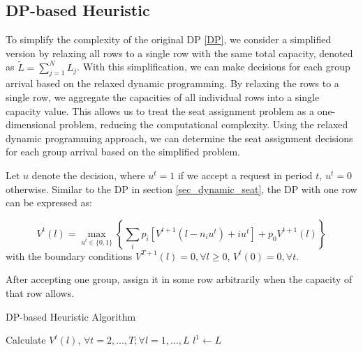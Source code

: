 

\subsection{DP-based Heuristic}
To simplify the complexity of the original DP \ref{DP}, we consider a simplified version by relaxing all rows to a single row with the same total capacity, denoted as $\tilde{L} = \sum_{j=1}^{N} L_j$. With this simplification, we can make decisions for each group arrival based on the relaxed dynamic programming. By relaxing the rows to a single row, we aggregate the capacities of all individual rows into a single capacity value. This allows us to treat the seat assignment problem as a one-dimensional problem, reducing the computational complexity. Using the relaxed dynamic programming approach, we can determine the seat assignment decisions for each group arrival based on the simplified problem.

Let $u$ denote the decision, where $u^{t} = 1$ if we accept a request in period $t$, $u^{t} =0$ otherwise. Similar to the DP in section \ref{sec_dynamic_seat}, the DP with one row can be expressed as:

$$V^{t}(l) =  \max_{u^{t} \in \{0,1\}} \left\{ \sum_{i} p_i [V^{t+1}(l-n_i u^{t})+ i u^{t}] + p_0 V^{t+1}(l)\right\} $$
with the boundary conditions $V^{T+1}(l) =0, \forall l \geq 0$, $V^{t}(0) =0, \forall t$.

After accepting one group, assign it in some row arbitrarily when the capacity of that row allows.

\begin{algorithm}[H]
  \caption{DP-based Heuristic Algorithm}\label{algo_dp_heuris}
  Calculate $V^{t}(l)$, $\forall t =2, \ldots, T; \forall l = 1, \ldots, L$\;
  $l^{1} \gets L$\;
\end{algorithm}

